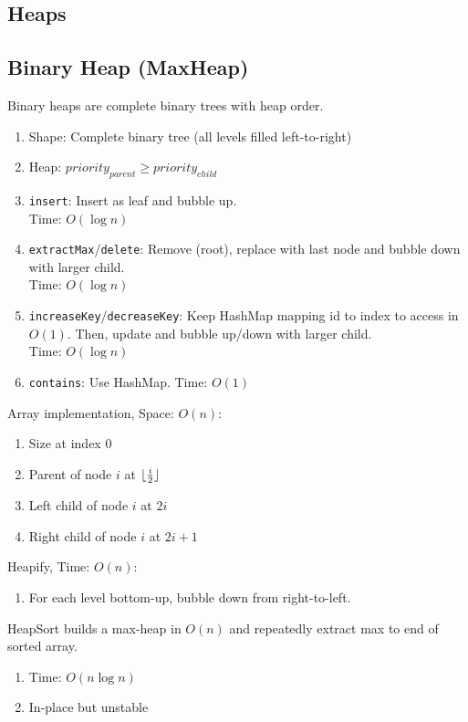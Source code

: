 \documentclass[12pt, a4paper]{article}
\begin{document}
\begin{multicols*}{3}
\colbreak
\section{Heaps}
\subsection{Binary Heap (MaxHeap)}
{\centering
{}
\par}
Binary heaps are complete binary trees with heap order.
\begin{enumerate}[\roman*.]
  \item Shape: Complete binary tree (all levels filled left-to-right)
  \item Heap: $priority_{parent} \geq priority_{child}$
  \item \lstinline|insert|: Insert as leaf and bubble up.\\Time: $O(\log n)$
  \item \lstinline|extractMax|/\lstinline|delete|: Remove (root), replace with last node and bubble down with larger child.\\Time: $O(\log n)$
  \item \lstinline|increaseKey|/\lstinline|decreaseKey|: Keep HashMap mapping id to index to access in $O(1)$. Then, update and bubble up/down with larger child.\\Time: $O(\log n)$
  \item \lstinline|contains|: Use HashMap. Time: $O(1)$
\end{enumerate}

Array implementation, Space: $O(n)$:
\begin{enumerate}[\roman*.]
  \item Size at index $0$
  \item Parent of node $i$ at $\lfloor \frac{i}{2} \rfloor$
  \item Left child of node $i$ at $2i$
  \item Right child of node $i$ at $2i+1$
\end{enumerate}

Heapify, Time: $O(n)$:
\begin{enumerate}[\roman*.]
  \item For each level bottom-up, bubble down from right-to-left.
\end{enumerate}

HeapSort builds a max-heap in $O(n)$ and repeatedly extract max to end of sorted array.
\begin{enumerate}[\roman*.]
  \item Time: $O(n\log n)$
  \item In-place but unstable
\end{enumerate}


\end{multicols*}
\end{document}
